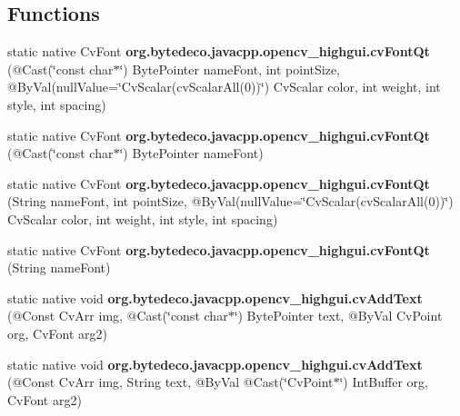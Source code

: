 \subsection*{Functions}
\begin{DoxyCompactItemize}
\item 
\mbox{\label{group__highgui__c_gaea43cae864e7d280e73ecd7aa3b8e70a}} 
static native Cv\+Font {\bfseries org.\+bytedeco.\+javacpp.\+opencv\+\_\+highgui.\+cv\+Font\+Qt} (@Cast(\char`\"{}const char$\ast$\char`\"{}) Byte\+Pointer name\+Font, int point\+Size, @By\+Val(null\+Value=\char`\"{}Cv\+Scalar(cv\+Scalar\+All(0))\char`\"{}) Cv\+Scalar color, int weight, int style, int spacing)
\item 
\mbox{\label{group__highgui__c_ga013a1b8007c8c5a6ab59e03896cfe93a}} 
static native Cv\+Font {\bfseries org.\+bytedeco.\+javacpp.\+opencv\+\_\+highgui.\+cv\+Font\+Qt} (@Cast(\char`\"{}const char$\ast$\char`\"{}) Byte\+Pointer name\+Font)
\item 
\mbox{\label{group__highgui__c_gaf88f7079ca1c84b149cb1f9c2da11a75}} 
static native Cv\+Font {\bfseries org.\+bytedeco.\+javacpp.\+opencv\+\_\+highgui.\+cv\+Font\+Qt} (String name\+Font, int point\+Size, @By\+Val(null\+Value=\char`\"{}Cv\+Scalar(cv\+Scalar\+All(0))\char`\"{}) Cv\+Scalar color, int weight, int style, int spacing)
\item 
\mbox{\label{group__highgui__c_gaabe9adf54474871a2f63250132ba5abc}} 
static native Cv\+Font {\bfseries org.\+bytedeco.\+javacpp.\+opencv\+\_\+highgui.\+cv\+Font\+Qt} (String name\+Font)
\item 
\mbox{\label{group__highgui__c_ga7fd28368e1fcdb7efa7861fdd59f6f93}} 
static native void {\bfseries org.\+bytedeco.\+javacpp.\+opencv\+\_\+highgui.\+cv\+Add\+Text} (@Const Cv\+Arr img, @Cast(\char`\"{}const char$\ast$\char`\"{}) Byte\+Pointer text, @By\+Val Cv\+Point org, Cv\+Font arg2)
\item 
\mbox{\label{group__highgui__c_gaf3b5efe9c6a278f2e79c42f529208ae8}} 
static native void {\bfseries org.\+bytedeco.\+javacpp.\+opencv\+\_\+highgui.\+cv\+Add\+Text} (@Const Cv\+Arr img, String text, @By\+Val @Cast(\char`\"{}Cv\+Point$\ast$\char`\"{}) Int\+Buffer org, Cv\+Font arg2)

\end{DoxyCompactItemize}
